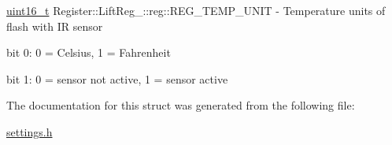 \mbox{\label{structRegister_1_1LiftReg___1_1reg_a7612e434618662a2144d457490084313}} 
{\footnotesize\ttfamily \mbox{\hyperlink{settings_8h_a017dd44e68049ffdd31500a8cd01ba68}{uint16\+\_\+t}} Register\+::\+Lift\+Reg\+\_\+\+::reg\+::\texorpdfstring{R\+E\+G\+\_\+\+T\+E\+M\+P\+\_\+\+U\+N\+IT}{REG\_TEMP\_UNIT}} - Temperature units of flash with IR sensor
\begin{DoxyCompactItemize}
\item bit 0: 0 = Celsius, 1 = Fahrenheit
\item bit 1: 0 = sensor not active, 1 = sensor active
\end{DoxyCompactItemize}


The documentation for this struct was generated from the following file\+:\begin{DoxyCompactItemize}
\item 
\mbox{\hyperlink{settings_8h}{settings.\+h}}\end{DoxyCompactItemize}
\newpage
